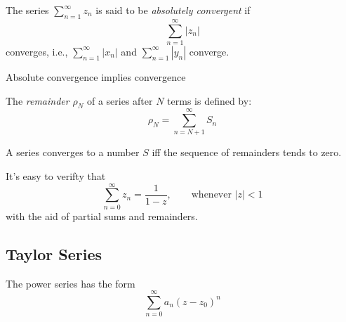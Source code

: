 \begin{definition}
The series $\sum_{n=1}^\infty z_n$ is said to be \emph{absolutely convergent} if
\[
\sum_{n=1}^\infty|z_n|
\]
converges, i.e., $\sum_{n=1}^\infty|x_n|$ and $\sum_{n=1}^\infty|y_n|$ converge.
\end{definition}
\begin{proposition}
Absolute convergence implies convergence
\end{proposition}

\begin{definition}[Remainder]
The \emph{remainder} $\rho_N$ of a series after $N$ terms is defined by:
\[
\rho_N=\sum_{n=N+1}^\infty S_n
\]
\end{definition}
\begin{proposition}
A series converges to a number $S$ iff the sequence of remainders tends to zero.
\end{proposition}

It's easy to verifty that
\[
\sum_{n=0}^\infty z_n=\frac{1}{1-z},\qquad\mbox{whenever }|z|<1
\]
with the aid of partial sums and remainders.

\subsection{Taylor Series}
\begin{definition}
The power series has the form
\[
\sum_{n=0}^\infty a_n(z-z_0)^n
\]
\end{definition}

